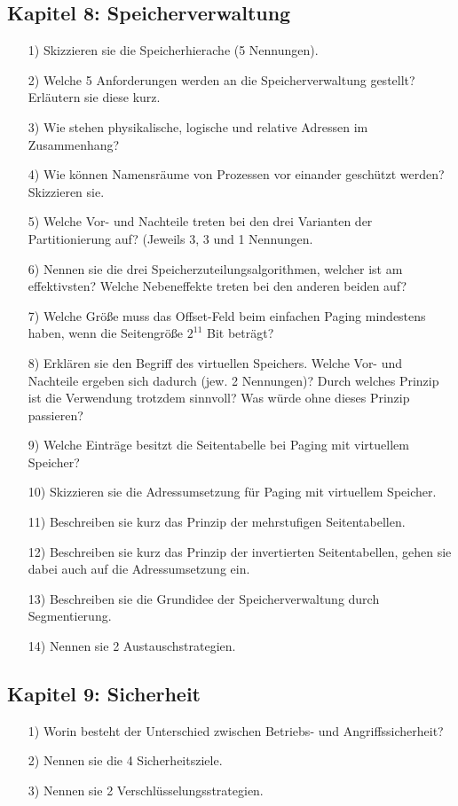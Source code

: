 \documentclass[11pt,a4paper]{article}
\begin{document}
\subsection*{Kapitel 8: Speicherverwaltung}
\begin{itemize}
\item[1)] Skizzieren sie die Speicherhierache (5 Nennungen).
\item[2)] Welche 5 Anforderungen werden an die Speicherverwaltung gestellt? Erläutern sie diese kurz.
\item[3)] Wie stehen physikalische, logische und relative Adressen im Zusammenhang?
\item[4)] Wie können Namensräume von Prozessen vor einander geschützt werden? Skizzieren sie.
\item[5)] Welche Vor- und Nachteile treten bei den drei Varianten der Partitionierung auf? (Jeweils 3, 3 und 1 Nennungen.
\item[6)] Nennen sie die drei Speicherzuteilungsalgorithmen, welcher ist am effektivsten? Welche Nebeneffekte treten bei den anderen beiden auf?
\item[7)] Welche Größe muss das Offset-Feld beim einfachen Paging mindestens haben, wenn die Seitengröße $2^{11}$ Bit beträgt?
\item[8)] Erklären sie den Begriff des virtuellen Speichers. Welche Vor- und Nachteile ergeben sich dadurch (jew. 2 Nennungen)? Durch welches Prinzip ist die Verwendung trotzdem sinnvoll? Was würde ohne dieses Prinzip passieren? 
\item[9)] Welche Einträge besitzt die Seitentabelle bei Paging mit virtuellem Speicher?
\item[10)] Skizzieren sie die Adressumsetzung für Paging mit virtuellem Speicher.
\item[11)] Beschreiben sie kurz das Prinzip der mehrstufigen Seitentabellen.
\item[12)] Beschreiben sie kurz das Prinzip der invertierten Seitentabellen, gehen sie dabei auch auf die Adressumsetzung ein.
\item[13)] Beschreiben sie die Grundidee der Speicherverwaltung durch Segmentierung.
\item[14)] Nennen sie 2 Austauschstrategien.
\end{itemize}


\pagebreak


\subsection*{Kapitel 9: Sicherheit}
\begin{itemize}
\item[1)] Worin besteht der Unterschied zwischen Betriebs- und Angriffssicherheit?
\item[2)] Nennen sie die 4 Sicherheitsziele.
\item[3)] Nennen sie 2 Verschlüsselungsstrategien.
\end{itemize}
\end{document}
